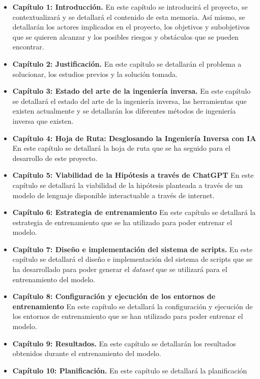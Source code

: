 \begin{itemize}
    \item \textbf{Capítulo 1: Introducción.} En este capítulo se introducirá el proyecto,
        se contextualizará y se detallará el contenido de esta memoria. Así mismo, se
        detallarán los actores implicados en el proyecto, los objetivos y subobjetivos
        que se quieren alcanzar y los posibles riesgos y obstáculos que se pueden encontrar.
    \item \textbf{Capítulo 2: Justificación.} En este capítulo se detallarán el problema
        a solucionar, los estudios previos y la solución tomada.
    \item \textbf{Capítulo 3: Estado del arte de la ingeniería inversa.} En este capítulo
        se detallará el estado del arte de la ingeniería inversa, las herramientas que
        existen actualmente y se detallarán los diferentes métodos de ingeniería inversa 
        que existen.
    \item \textbf{Capítulo 4: Hoja de Ruta: Desglosando la Ingeniería Inversa con IA} En este
        capítulo se detallará la hoja de ruta que se ha seguido para el desarrollo de este
        proyecto.
    \item \textbf{Capítulo 5: Viabilidad de la Hipótesis a través de ChatGPT} En este capítulo
        se detallará la viabilidad de la hipótesis planteada a través de un modelo de lenguaje
        disponible interactuable a través de internet.
    \item \textbf{Capítulo 6: Estrategia de entrenamiento} En este capítulo se detallará
    la estrategia de entrenamiento que se ha utilizado para poder entrenar el modelo.
    \item \textbf{Capítulo 7: Diseño e implementación del sistema de scripts.} En este
        capítulo se detallará el diseño e implementación del sistema de scripts que se
        ha desarrollado para poder generar el \textit{dataset} que se utilizará para el
        entrenamiento del modelo.
    \item \textbf{Capítulo 8: Configuración y ejecución de los entornos de entrenamiento} En
        este capítulo se detallará la configuración y ejecución de los entornos de entrenamiento
        que se han utilizado para poder entrenar el modelo.
    \item \textbf{Capítulo 9: Resultados.} En este capítulo se detallarán los resultados
        obtenidos durante el entrenamiento del modelo.
    \item \textbf{Capítulo 10: Planificación.} En este capítulo se detallará la planificación

\end{itemize}
